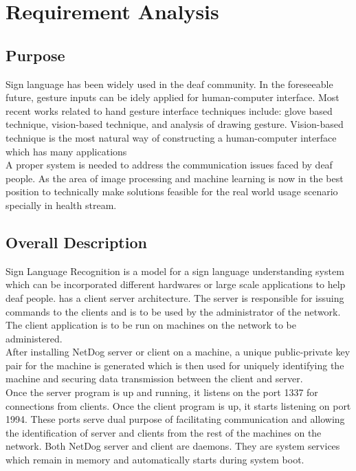 \chapter{Requirement Analysis}

\section{Purpose}
\par
Sign language has been widely used in the deaf community. In the foreseeable future, gesture inputs can be idely applied for human-computer interface. Most recent works related to hand gesture interface techniques include: glove based technique, vision-based technique, and analysis of drawing gesture. Vision-based technique is the
most natural way of constructing a human-computer interface which has many applications  \\

A proper system is needed to address the communication issues faced by deaf people. As the area of image processing and machine learning is now in the best position to technically make solutions feasible for the real world usage scenario specially in health stream. \\

\section{Overall Description}
\par
Sign Language Recognition is a model for a sign language understanding system which can be incorporated different hardwares or large scale applications to help deaf people. has a client server architecture. The server is responsible for issuing
commands to the clients and is to be used by the administrator of the network.
The client application is to be run on machines on the network to be
administered.\\

After installing NetDog server or client on a machine, a unique public-private
key pair for the machine is generated which is then used for uniquely
identifying the machine and securing data transmission between the client and
server.\\

Once the server program is up and running, it listens on the port 1337 for
connections from clients. Once the client program is up, it starts listening on
port 1994. These ports serve dual purpose of facilitating communication and
allowing the identification of server and clients from the rest of the machines
on the network. Both NetDog server and client are daemons. They are system 
services which remain in memory and automatically starts during system boot.\\

